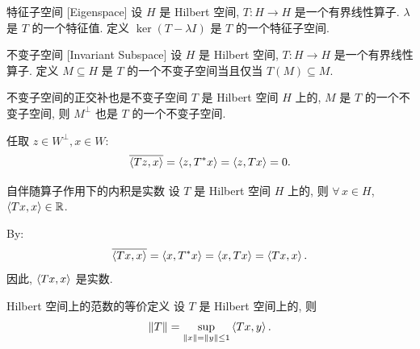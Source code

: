         \begin{dfn}
            [eigenspace]
            {特征子空间}
            [Eigenspace]
            设 $H$ 是 Hilbert 空间, $T: H \to H$ 是一个有界线性算子. $\lambda$ 是 $T$ 的一个特征值. 定义 $\ker (T-\lambda I)$ 是 $T$ 的一个特征子空间.
        \end{dfn}

        \begin{dfn}
            {不变子空间}
            [Invariant Subspace]
            设 $H$ 是 Hilbert 空间, $T: H \to H$ 是一个有界线性算子. 定义 $M \subseteq H$ 是 $T$ 的一个不变子空间当且仅当 \(T(M) \subseteq M\).
        \end{dfn}

        \begin{thm}
            {不变子空间的正交补也是不变子空间}
            \(T\) 是 Hilbert 空间 \(H\) 上的\SelfAdjOp{}, \(M\) 是 \(T\) 的一个不变子空间, 则 \(M^\perp\) 也是 \(T\) 的一个不变子空间.
        \end{thm}

        \begin{prf}
            任取 \(z\in W^\perp, x\in W\):
            \[\overline{\expval{Tz, x}}=\expval{z, T^* x}=\expval{z, T x}=0.\]
        \end{prf}
        
        \begin{thm}
            {自伴随算子作用下的内积是实数}
            设 \(T\) 是 Hilbert 空间 \(H\) 上的\SelfAdjOp{}, 则 \(\forall\,x\in H\), \(\expval{Tx, x}\in\operatorname{\mathbb{R}}\).
        \end{thm}

        \begin{prf}
            By:
            \[\overline{\expval{Tx, x}}=\expval{x, T^* x}=\expval{x, T x}=\expval{Tx, x}.\]
            因此, \(\expval{Tx, x}\) 是实数.
        \end{prf}

        \begin{thm}
            {Hilbert 空间上的范数的等价定义}
            设 \(T\) 是 Hilbert 空间上的\SelfAdjOp{}, 则
            \[\norm{T}=\sup_{\norm{x}=\norm{y}\leq 1}\expval{Tx, y}.\]
        \end{thm}

